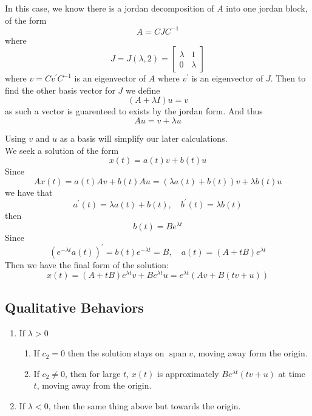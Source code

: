 \documentclass[a4paper, 12pt]{book}
\begin{document}
In this case, we know there is a jordan decomposition of \( A \) into one jordan block, of the form \[
	A=C J C^{-1}
\]
where \[
	J= J(\lambda,2)=
	\begin{bmatrix}
		\lambda & 1       \\
		0       & \lambda
	\end{bmatrix}
\]
where \( v= C v^\prime C^{-1}  \) is an eigenvector of \( A \) where \( v^\prime \) is an eigenvector of \( J \). Then to find the other basis vector for \( J \) we define \[
	(A+\lambda I)u=v
\]
as such a vector is guarenteed to exists by the jordan form. And thus \[
	Au=v+\lambda u
\]

Using \( v \) and \( u \) as a basis will simplify our later calculations.\\

We seek a solution of the form \[
	x(t)=a(t)v+b(t)u
\]
Since \[
	Ax(t)=a(t)Av+b(t)Au=(\lambda a(t)+b(t))v+\lambda b(t)u
\]
we have that \[
	a^\prime(t)=\lambda a(t)+b(t), \quad b^\prime(t)=\lambda b(t)
\]
then \[
	b(t)=Be^{\lambda t}
\]
Since \[
	(e^{-\lambda t} a(t))^\prime=b(t) e^{-\lambda t}=B, \quad a(t)= (A+tB)e^{\lambda t}
\]
Then we have the final form of the solution:
\[
	x(t)=(A+tB)e^{\lambda t}v +Be^{\lambda t} u=e^{\lambda t}(Av+B(tv+u))
\]
\subsection{Qualitative Behaviors}
\begin{enumerate}
	\item If \( \lambda>0  \)
	      \begin{enumerate}
		      \item If \( c_2=0 \) then the solution stays on \( \operatorname{span} v \), moving away form the origin.
		      \item If \( c_2 \neq 0 \), then for large \( t \), \( x(t) \) is approximately \( Be^{\lambda t}(tv+u) \) at time \( t \), moving away from the origin.
	      \end{enumerate}
	\item If \( \lambda<0 \), then the same thing above but towards the origin.
\end{enumerate}
\end{document}
